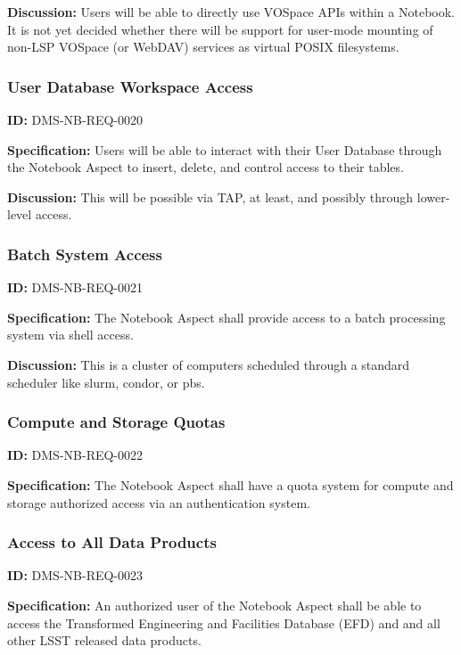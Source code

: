 \documentclass[SE,toc,lsstdraft]{lsstdoc}
\begin{document}
\textbf{Discussion:}
Users will be able to directly use VOSpace APIs within a Notebook.  It is not yet decided whether there will be support for user-mode mounting of non-LSP VOSpace (or WebDAV) services as virtual POSIX filesystems.

\subsubsection{User Database Workspace Access}

\label{DMS-NB-REQ-0020}
\textbf{ID:} DMS-NB-REQ-0020

\textbf{Specification:}
Users will be able to interact with their User Database through the Notebook Aspect to insert, delete, and control access to their tables.

\textbf{Discussion:}
This will be possible via TAP, at least, and possibly through lower-level access.

\subsubsection{Batch System Access}

\label{DMS-NB-REQ-0021}
\textbf{ID:} DMS-NB-REQ-0021

\textbf{Specification:}
The Notebook Aspect shall provide access to a batch processing system via shell access.

\textbf{Discussion:}
This is a cluster of computers scheduled through a standard scheduler like slurm, condor, or pbs.

\subsubsection{Compute and Storage Quotas}

\label{DMS-NB-REQ-0022}
\textbf{ID:} DMS-NB-REQ-0022

\textbf{Specification:}
The Notebook Aspect shall have a quota system for compute and storage authorized access via an authentication system.

\subsubsection{Access to All Data Products}

\label{DMS-NB-REQ-0023}
\textbf{ID:} DMS-NB-REQ-0023

\textbf{Specification:}
An authorized user of the Notebook Aspect shall be able to access the Transformed Engineering and Facilities Database (EFD) and and all other LSST released data products.
\end{document}
